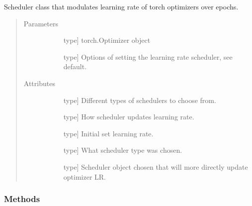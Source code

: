 \documentclass[letterpaper,10pt,english]{sphinxmanual}
\begin{document}
\begin{fulllineitems}
\label{\detokenize{index:pathflowai.schedulers.Scheduler}}
Scheduler class that modulates learning rate of torch optimizers over epochs.
\begin{quote}\begin{description}
\item[{Parameters}] \leavevmode\begin{description}
\item[{}] \leavevmode{[}type{]}
torch.Optimizer object

\item[{}] \leavevmode{[}type{]}
Options of setting the learning rate scheduler, see default.

\end{description}

\item[{Attributes}] \leavevmode\begin{description}
\item[{}] \leavevmode{[}type{]}
Different types of schedulers to choose from.

\item[{}] \leavevmode{[}type{]}
How scheduler updates learning rate.

\item[{}] \leavevmode{[}type{]}
Initial set learning rate.

\item[{}] \leavevmode{[}type{]}
What scheduler type was chosen.

\item[{}] \leavevmode{[}type{]}
Scheduler object chosen that will more directly update optimizer LR.

\end{description}

\end{description}\end{quote}
\subsubsection*{Methods}



\end{fulllineitems}
\end{document}
